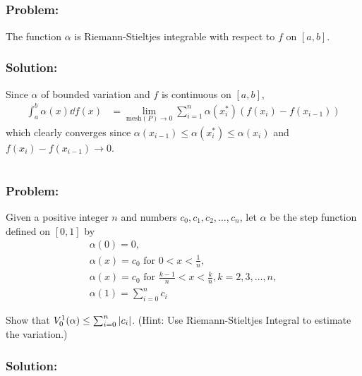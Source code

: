 \documentclass[]{article}
\begin{document}
\subsection{}
\subsubsection*{Problem:}
The function $\alpha$ is Riemann-Stieltjes integrable with respect to $f$ on $[a,b]$.

\subsubsection*{Solution:}
Since $\alpha$ of bounded variation and $f$ is continuous on $[a,b]$, \begin{align*}
    \int_{a}^{b} \alpha(x) \dd{f(x)}
        &= \lim_{\text{mesh}(P)\to 0} \sum_{i=1}^{n} \alpha(x_i^*) (f(x_i) - f(x_{i-1}))
\end{align*}
which clearly converges since $\alpha(x_{i-1}) \leq \alpha(x_i^*) \leq \alpha(x_{i})$ and $f(x_i) - f(x_{i-1}) \to 0$.

\newpage
\section{}
\subsubsection*{Problem:}
Given a positive integer $n$ and numbers $c_0, c_1, c_2, \dots, c_n$, let $\alpha$ be the step function defined on $[0,1]$ by \begin{align*}
    \alpha(0) = 0,\\
    \alpha(x) = c_0 \text{ for } 0 < x < \frac{1}{n},\\
    \alpha(x) = c_0 \text{ for } \frac{k-1}{n} < x < \frac{k}{n}, k = 2, 3, \dots, n,\\
    \alpha(1) = \sum_{i=0}^{n} c_i
\end{align*}

Show that $V_{0}^{1}(\alpha) \leq \sum_{i=0}^{n} \abs{c_i}$. 
(Hint: Use Riemann-Stieltjes Integral to estimate the variation.)

\subsubsection*{Solution:}
\end{document}

